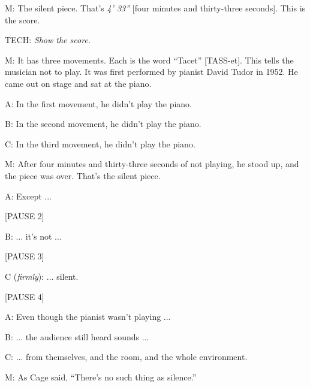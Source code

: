 \documentclass[17pt]{extarticle}
\begin{document}
M: The silent piece.  That's \textit{4' 33''} [four minutes and thirty-three seconds].  This is the score.

TECH:  \textit{Show the score.}

M: It has three movements.  Each is the word ``Tacet'' [TASS-et].  This tells the musician not to play.  It was first performed by pianist David Tudor in 1952.  He came out on stage and sat at the piano.

A: In the first movement, he didn't play the piano.

B: In the second movement, he didn't play the piano.

C: In the third movement, he didn't play the piano.

M: After four minutes and thirty-three seconds of not playing, he stood up, and the piece was over.  That's the silent piece.

A: Except ...

[PAUSE 2]

B: ... it's not ...

[PAUSE 3]

C (\textit{firmly}): ... silent.

[PAUSE 4]

A: Even though the pianist wasn't playing ...

B: ... the audience still heard sounds ...

C: ... from themselves, and the room, and the whole environment.

M:  As Cage said, ``There's no such thing as silence.''
\end{document}
